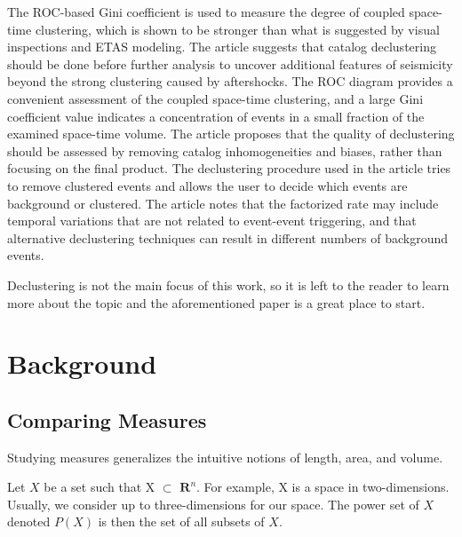 \documentclass[12pt]{article} %
\theoremstyle{plain}
\begin{document}
	The ROC-based Gini coefficient is used to measure the degree of coupled space-time clustering, which is shown to be stronger than what is suggested by visual inspections and ETAS modeling. The article suggests that catalog declustering should be done before further analysis to uncover additional features of seismicity beyond the strong clustering caused by aftershocks. The ROC diagram provides a convenient assessment of the coupled space-time clustering, and a large Gini coefficient value indicates a concentration of events in a small fraction of the examined space-time volume. The article proposes that the quality of declustering should be assessed by removing catalog inhomogeneities and biases, rather than focusing on the final product. The declustering procedure used in the article tries to remove clustered events and allows the user to decide which events are background or clustered. The article notes that the factorized rate may include temporal variations that are not related to event-event triggering, and that alternative declustering techniques can result in different numbers of background events.

	Declustering is not the main focus of this work, so it is left to the reader to learn more about the topic and the aforementioned paper is a great place to start. 
	
		

	\section{Background}
	\label{sec:method}
	
	\subsection{Comparing Measures}
	Studying measures generalizes the intuitive notions of length, area, and volume. 
	
	Let $X$ be a set such that X $\subset$ $\mathbf{R}^n$. For example, X is a space in two-dimensions. Usually, we consider up to three-dimensions for our space. The power set of $X$ denoted $P(X)$ is then the set of all subsets of $X$. 
	
\end{document}
